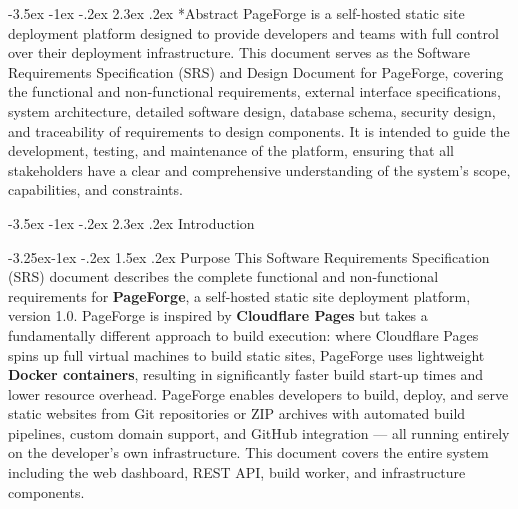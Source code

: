 \documentclass[12pt,a4paper]{article}
\makeatletter
\renewcommand\section{\@startsection{section}{1}{\z@}%
  {-3.5ex \@plus -1ex \@minus -.2ex}%
  {2.3ex \@plus .2ex}%
  {\needspace{3\baselineskip}\normalfont\Large\bfseries}}
\renewcommand\subsection{\@startsection{subsection}{2}{\z@}%
  {-3.25ex\@plus -1ex \@minus -.2ex}%
  {1.5ex \@plus .2ex}%
  {\needspace{2\baselineskip}\normalfont\large\bfseries}}
\makeatother
\begin{document}
\section*{Abstract}
PageForge is a self-hosted static site deployment platform designed to provide developers and teams with full control over their deployment infrastructure. This document serves as the Software Requirements Specification (SRS) and Design Document for PageForge, covering the functional and non-functional requirements, external interface specifications, system architecture, detailed software design, database schema, security design, and traceability of requirements to design components. It is intended to guide the development, testing, and maintenance of the platform, ensuring that all stakeholders have a clear and comprehensive understanding of the system's scope, capabilities, and constraints.
\newpage

\tableofcontents
\newpage

\section{Introduction}

\subsection{Purpose}
This Software Requirements Specification (SRS) document describes the complete functional and non-functional requirements for \textbf{PageForge}, a self-hosted static site deployment platform, version 1.0. PageForge is inspired by \textbf{Cloudflare Pages} but takes a fundamentally different approach to build execution: where Cloudflare Pages spins up full virtual machines to build static sites, PageForge uses lightweight \textbf{Docker containers}, resulting in significantly faster build start-up times and lower resource overhead. PageForge enables developers to build, deploy, and serve static websites from Git repositories or ZIP archives with automated build pipelines, custom domain support, and GitHub integration --- all running entirely on the developer's own infrastructure. This document covers the entire system including the web dashboard, REST API, build worker, and infrastructure components.
\end{document}
